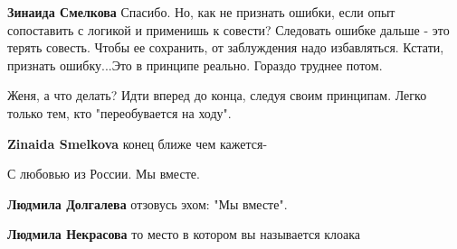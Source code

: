\begin{itemize}
\begin{itemize}
\textbf{Зинаида Смелкова} Спасибо. Но, как не признать ошибки, если опыт сопоставить с логикой и применишь к совести? Следовать ошибке дальше - это терять совесть. Чтобы ее сохранить, от заблуждения надо избавляться. Кстати, признать ошибку...Это в принципе реально. Гораздо труднее потом.

 
Женя, а что делать? Идти вперед до конца, следуя своим принципам. Легко только тем, кто "переобувается на ходу".

 
\textbf{Zinaida Smelkova} конец ближе чем кажется-
\end{itemize}

 
С любовью из России. Мы вместе.

\begin{itemize}
 
\textbf{Людмила Долгалева} отзовусь эхом: "Мы вместе".

 
\textbf{Людмила Некрасова} то место в котором вы называется клоака

 

\end{itemize}
\end{itemize}
